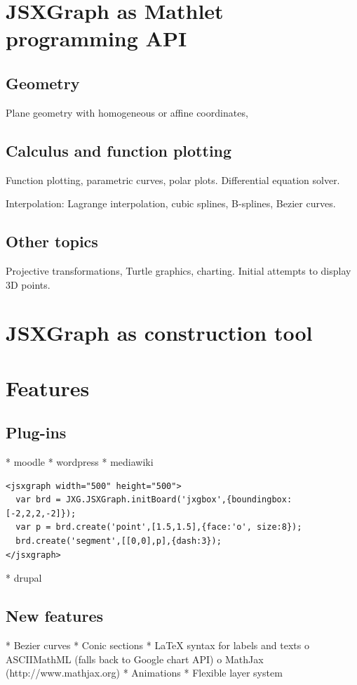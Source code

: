 \documentclass[12pt,a4paper]{article}%
\begin{document}
\section{JSXGraph as Mathlet programming API}
\subsection{Geometry}
Plane geometry with 
homogeneous or affine coordinates,



\subsection{Calculus and function plotting}
Function plotting, parametric curves, polar plots. 
Differential equation solver.

Interpolation: Lagrange interpolation, 
cubic splines, B-splines, Bezier curves.



\subsection{Other topics}
Projective transformations,
Turtle graphics, 
charting.
Initial attempts to display 3D points.



\section{JSXGraph as construction tool}


\section{Features}

\subsection{Plug-ins}
    * moodle
    * wordpress
    * mediawiki
\begin{verbatim}
<jsxgraph width="500" height="500">
  var brd = JXG.JSXGraph.initBoard('jxgbox',{boundingbox:[-2,2,2,-2]});
  var p = brd.create('point',[1.5,1.5],{face:'o', size:8});
  brd.create('segment',[[0,0],p],{dash:3});
</jsxgraph>
\end{verbatim}                    
    * drupal 

\subsection{New features}
    * Bezier curves
    * Conic sections
    * \LaTeX{} syntax for labels and texts
          o ASCIIMathML (falls back to Google chart API)
          o MathJax (http://www.mathjax.org)
    * Animations
    * Flexible layer system 
\end{document}
